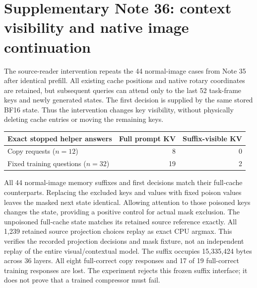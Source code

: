 \documentclass[10pt,a4paper]{article}
\begin{document}

\section*{Supplementary Note 36: context visibility and native image continuation}
The source-reader intervention repeats the 44 normal-image cases from Note 35
after identical prefill. All existing cache positions and native rotary
coordinates are retained, but subsequent queries can attend only to the last
52 task-frame keys and newly generated states. The first decision is supplied
by the same stored BF16 state. Thus the intervention changes key visibility,
without physically deleting cache entries or moving the remaining keys.

\begin{center}\small
\begin{tabular}{lrr}
\toprule
Exact stopped helper answers & Full prompt KV & Suffix-visible KV\\
\midrule
Copy requests ($n=12$) & 8 & 0\\
Fixed training questions ($n=32$) & 19 & 2\\
\bottomrule
\end{tabular}
\end{center}

All 44 normal-image memory suffixes and first decisions match their full-cache
counterparts. Replacing the excluded keys and values with fixed poison values
leaves the masked next state identical. Allowing attention to those poisoned
keys changes the state, providing a positive control for actual mask exclusion.
The unpoisoned full-cache state matches its retained source reference exactly.
All 1,239 retained source projection choices replay as exact CPU argmax.
This verifies the recorded projection decisions and mask fixture, not an
independent replay of the entire visual/contextual model. The suffix occupies
15,335,424 bytes across 36 layers. All eight full-correct copy responses and
17 of 19 full-correct training responses are lost. The experiment rejects this
frozen suffix interface; it does not prove that a trained compressor must fail.
\end{document}
